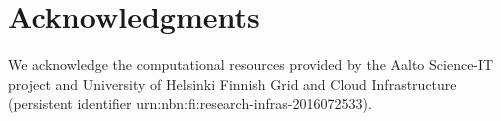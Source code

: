 \section*{Acknowledgments}

We acknowledge the computational resources provided by the Aalto Science-IT project and University of Helsinki Finnish Grid and Cloud Infrastructure (persistent identifier urn:nbn:fi:research-infras-2016072533).